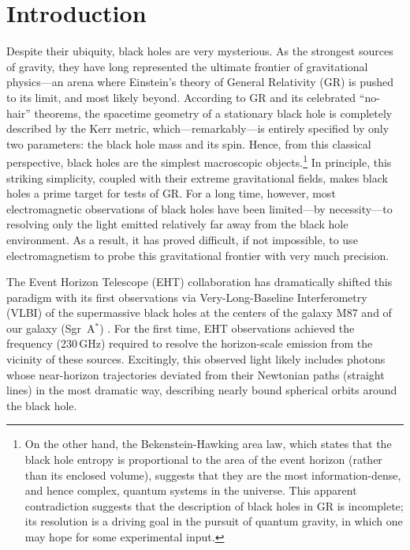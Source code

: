 \documentclass[graybox,envcountchap]{svmult}
\begin{document}

\tableofcontents
\clearpage

\section{Introduction}

Despite their ubiquity, black holes are very mysterious.
As the strongest sources of gravity, they have long represented the ultimate frontier of gravitational physics---an arena where Einstein's theory of General Relativity (GR) is pushed to its limit, and most likely beyond.
According to GR and its celebrated ``no-hair'' theorems, the spacetime geometry of a stationary black hole is completely described by the Kerr metric, which---remarkably---is entirely specified by only two parameters: the black hole mass and its spin.
Hence, from this classical perspective, black holes are the simplest macroscopic objects.\footnote{On the other hand, the Bekenstein-Hawking area law, which states that the black hole entropy is proportional to the area of the event horizon (rather than its enclosed volume), suggests that they are the most information-dense, and hence complex, quantum systems in the universe.
This apparent contradiction suggests that the description of black holes in GR is incomplete; its resolution is a driving goal in the pursuit of quantum gravity, in which one may hope for some experimental input.}
In principle, this striking simplicity, coupled with their extreme gravitational fields, makes black holes a prime target for tests of GR.
For a long time, however, most electromagnetic observations of black holes have been limited---by necessity---to resolving only the light emitted relatively far away from the black hole environment.
As a result, it has proved difficult, if not impossible, to use electromagnetism to probe this gravitational frontier with very much precision.

The Event Horizon Telescope (EHT) collaboration has dramatically shifted this paradigm with its first observations via Very-Long-Baseline Interferometry (VLBI) of the supermassive black holes at the centers of the galaxy M87 \cite{EHT2019I} and of our galaxy (Sgr~A$^*$) 
\cite{EHT2022I}.
For the first time, EHT observations achieved the frequency (230\,GHz) required to resolve the horizon-scale emission from the vicinity of these sources.
Excitingly, this observed light likely includes photons whose near-horizon trajectories deviated from their Newtonian paths (straight lines) in the most dramatic way, describing nearly bound spherical orbits around the black hole.
\end{document}
